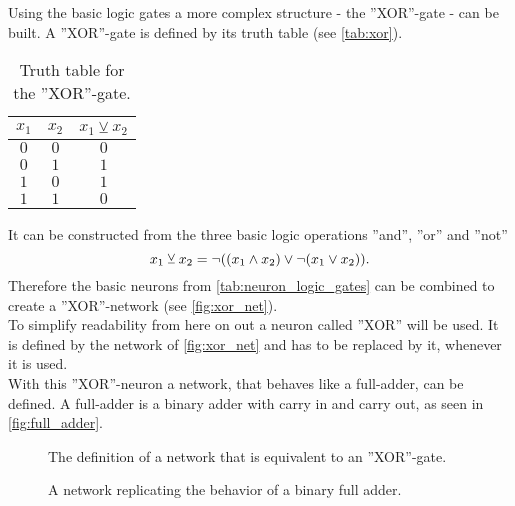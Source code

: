 \medskip
\noindent Using the basic logic gates a more complex structure - the ''XOR''-gate - can be built. A ''XOR''-gate is defined by its truth table (see \autoref{tab:xor}).
\begin{table}[H]
\centering
\begin{tabular}{c c|c}
$x_1$ & $x_2$ & $x_1\veebar x_2$\\
\hline
$0$ & $0$ & $0$\\
$0$ & $1$ & $1$\\
$1$ & $0$ & $1$\\
$1$ & $1$ & $0$
\end{tabular}
\caption[Truth table for  the ''XOR''-gate]{Truth table for the ''XOR''-gate.}\label{tab:xor}
\end{table}
It can be constructed from the three basic logic operations ''and'', ''or'' and ''not''
\begin{equation}
x_1\veebar x_2 = \lnot{\left( {\left( x_1\land x_2 \right)}\lor\lnot{\left( x_1\lor x_2 \right)} \right)}.
\end{equation}
Therefore the basic neurons from \autoref{tab:neuron_logic_gates} can be combined to create a ''XOR''-network (see \autoref{fig:xor_net}).\\
To simplify readability from here on out a neuron called ''XOR'' will be used. It is defined by the network of \autoref{fig:xor_net} and has to be replaced by it, whenever it is used.\\
With this ''XOR''-neuron a network, that behaves like a full-adder, can be defined. A full-adder is a binary adder with carry in and carry out, as seen in \autoref{fig:full_adder}.
\begin{figure}[H]
\centering

\caption[''XOR''-network]{The definition of a network that is equivalent to an ''XOR''-gate.}\label{fig:xor_net}
\end{figure}
\begin{figure}[H]
\centering

\caption[Full adder network]{A network replicating the behavior of a binary full adder.}\label{fig:full_adder}
\end{figure}


